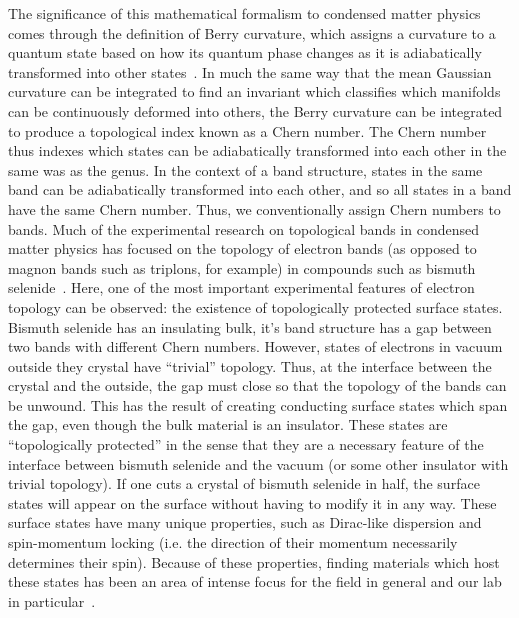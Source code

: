 \documentclass{thesis-umich}
\begin{document}
The significance of this mathematical formalism to condensed matter physics comes through the definition of Berry curvature, which assigns a curvature to a quantum state based on how its quantum phase changes as it is  adiabatically transformed into other states~\cite{Berry1984}. In much the same way that the mean Gaussian curvature can be integrated to find an invariant which classifies which manifolds can be continuously deformed into others, the Berry curvature can be integrated to produce a topological index known as a Chern number. The Chern number thus indexes which states can be adiabatically transformed into each other in the same was as the genus. In the context of a band structure, states in the same band can be adiabatically transformed into each other, and so all states in a band have the same Chern number. Thus, we conventionally assign Chern numbers to bands. Much of the experimental research on topological bands in condensed matter physics has focused on the topology of electron bands (as opposed to magnon bands such as triplons, for example) in compounds such as bismuth selenide~\cite{Hsieh2008}. Here, one of the most important experimental features of electron topology can be observed: the existence of topologically protected surface states. Bismuth selenide has an insulating bulk, it's band structure has a gap between two bands with different Chern numbers. However, states of electrons in vacuum outside they crystal have ``trivial'' topology. Thus, at the interface between the crystal and the outside, the gap must close so that the topology of the bands can be unwound. This has the result of creating conducting surface states which span the gap, even though the bulk material is an insulator. These states are ``topologically protected'' in the sense that they are a necessary feature of the interface between bismuth selenide and the vacuum (or some other insulator with trivial topology). If one cuts a crystal of bismuth selenide in half, the surface states will appear on the surface without having to modify it in any way. These surface states have many unique properties, such as Dirac-like dispersion and spin-momentum locking (i.e. the direction of their momentum necessarily determines their spin)\cite{Fu2007}. Because of these properties, finding materials which host these states has been an area of intense focus for the field in general and our lab in particular~\cite{Li2014}.
\end{document}
